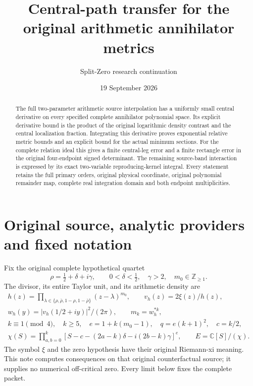 \documentclass[11pt]{article}
\title{Central-path transfer for the original arithmetic annihilator metrics}
\author{Split-Zero research continuation}
\date{19 September 2026}
\newcommand{\C}{\mathbb C}
\begin{document}
\maketitle

\begin{abstract}
The full two-parameter arithmetic source interpolation has a uniformly
small central derivative on every specified complete annihilator
polynomial space.  Its explicit derivative bound is the product of the
original logarithmic density contrast and the central localization
fraction.  Integrating this derivative proves exponential relative
metric bounds and an explicit bound for the actual minimum sections.
For the complete relation ideal this gives a finite central-leg error
and a finite rectangle error in the original four-endpoint signed
determinant.  The remaining source-band interaction is expressed by its
exact two-variable reproducing-kernel integral.  Every statement retains
the full primary orders, original physical coordinate, original
polynomial remainder map, complete real integration domain and both
endpoint multiplicities.
\end{abstract}

\section{Original source, analytic providers and fixed notation}

Fix the original complete hypothetical quartet
\[
 \rho=\tfrac12+\delta+i\gamma,\qquad
 0<\delta<\tfrac12,\quad\gamma>2,\quad m_0\in\mathbb Z_{\ge1}.
\]
The divisor, its entire Taylor unit, and its arithmetic density are
\begin{equation}\tag{CPT1}
\begin{gathered}
 h(z)=\prod_{\lambda\in\{\rho,\bar\rho,1-\rho,1-\bar\rho\}}
             (z-\lambda)^{m_0},\qquad
 v_h(z)=2\xi(z)/h(z),\\
 w_h(y)=|v_h(1/2+iy)|^2/(2\pi),\qquad m_k=w_h^{*k},\\
 k\equiv1\pmod4,\quad k\ge5,\quad
 e=1+k(m_0-1),\quad q=e(k+1)^2,\quad c=k/2,\\
 \chi(S)=\prod_{a,b=0}^k
  [S-c-(2a-k)\delta-i(2b-k)\gamma]^e,\qquad
 E=\C[S]/(\chi).
\end{gathered}
\end{equation}
The symbol \(\xi\) and the zero hypothesis have their original
Riemann-xi meaning.  This note computes consequences on that original
counterfactual source; it supplies no numerical off-critical zero.
Every limit below fixes the complete packet.
\end{document}

